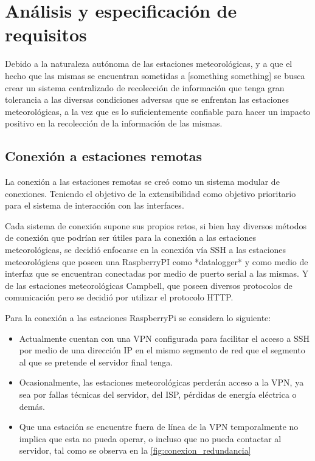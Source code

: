 
\section{Análisis y especificación de requisitos}

Debido a la naturaleza autónoma de las estaciones meteorológicas, y a que el hecho que las mismas se encuentran sometidas a [something something] se busca crear un sistema centralizado de recolección de información que tenga gran tolerancia a las diversas condiciones adversas que se enfrentan las estaciones meteorológicas, a la vez que es lo suficientemente confiable para hacer un impacto positivo en la recolección de la información de las mismas.

\subsection{Conexión a estaciones remotas}

La conexión a las estaciones remotas se creó como un sistema modular de conexiones. Teniendo el objetivo de la extensibilidad como objetivo prioritario para el sistema de interacción con las interfaces.

Cada sistema de conexión supone sus propios retos, si bien hay diversos métodos de conexión que podrían ser útiles para la conexión a las estaciones meteorológicas, se decidió enfocarse en la conexión vía SSH a las estaciones meteorológicas que poseen una RaspberryPI como *datalogger* y como medio de interfaz que se encuentran conectadas por medio de puerto serial a las mismas. Y de las estaciones meteorológicas Campbell, que poseen diversos protocolos de comunicación pero se decidió por utilizar el protocolo HTTP.

Para la conexión a las estaciones RaspberryPi se considera lo siguiente:

\begin{itemize}
   \item Actualmente cuentan con una VPN configurada para facilitar el acceso a SSH por medio de una dirección IP en el mismo segmento de red que el segmento al que se pretende el servidor final tenga.
   \item Ocasionalmente, las estaciones meteorológicas perderán acceso a la VPN, ya sea por fallas técnicas del servidor, del ISP, pérdidas de energía eléctrica o demás.
   \item Que una estación se encuentre fuera de línea de la VPN temporalmente no implica que esta no pueda operar, o incluso que no pueda contactar al servidor, tal como se observa en la \ref{fig:conexion_redundancia}
\end{itemize}

